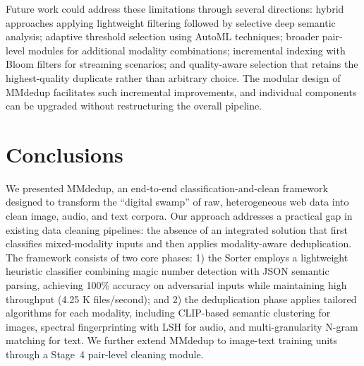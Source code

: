 \documentclass[conference]{IEEEtran}
\begin{document}
Future work could address these limitations through several directions: hybrid approaches applying lightweight filtering followed by selective deep semantic analysis; adaptive threshold selection using AutoML techniques; broader pair-level modules for additional modality combinations; incremental indexing with Bloom filters for streaming scenarios; and quality-aware selection that retains the highest-quality duplicate rather than arbitrary choice. The modular design of MMdedup facilitates such incremental improvements, and individual components can be upgraded without restructuring the overall pipeline.

\section{Conclusions}
\label{sec:conclusion}

We presented MMdedup, an end-to-end classification-and-clean framework designed to transform the ``digital swamp'' of raw, heterogeneous web data into clean image, audio, and text corpora. Our approach addresses a practical gap in existing data cleaning pipelines: the absence of an integrated solution that first classifies mixed-modality inputs and then applies modality-aware deduplication. The framework consists of two core phases: 1) the Sorter employs a lightweight heuristic classifier combining magic number detection with JSON semantic parsing, achieving 100\% accuracy on adversarial inputs while maintaining high throughput (4.25 K files/second); and 2) the deduplication phase applies tailored algorithms for each modality, including CLIP-based semantic clustering for images, spectral fingerprinting with LSH for audio, and multi-granularity N-gram matching for text. We further extend MMdedup to image-text training units through a Stage~4 pair-level cleaning module.
\end{document}
